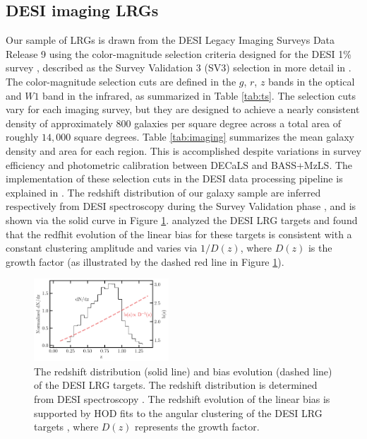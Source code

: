 \subsection{DESI imaging LRGs}
Our sample of LRGs is drawn from the DESI Legacy Imaging Surveys Data Release 9 \citep[DR9;][]{dey2018overview} using the color-magnitude selection criteria designed for the DESI 1\% survey \citep{desi2023sv}, described as the Survey Validation 3 (SV3) selection in more detail in \cite{zhou2022target}. The color-magnitude selection cuts are defined in the $g$, $r$, $z$ bands in the optical and $W1$ band in the infrared, as summarized in Table \ref{tab:ts}. The selection cuts vary for each imaging survey, but they are designed to achieve a nearly consistent density of approximately $800$ galaxies per square degree across a total area of roughly $14,000$ square degrees. Table \ref{tab:imaging} summarizes the mean galaxy density and area for each region. This is accomplished despite variations in survey efficiency and photometric calibration between DECaLS and BASS+MzLS. The implementation of these selection cuts in the DESI data processing pipeline is explained in \cite{myers2022}. The redshift distribution of our galaxy sample are inferred respectively from DESI spectroscopy during the Survey Validation phase \citep{desi2023sv}, and is shown via the solid curve in Figure \ref{fig:nz}. \cite{zhou2021clustering} analyzed the DESI LRG targets and found that the redfhit evolution of the linear bias for these targets is consistent with a constant clustering amplitude and varies via $1/D(z)$, where $D(z)$ is the growth factor (as illustrated by the dashed red line in Figure \ref{fig:nz}). 

\begin{figure}
 \centering
 \includegraphics[width=0.45\textwidth]{figures/nz_lrg.pdf}
 \caption{The redshift distribution (solid line) and bias evolution (dashed line) of the DESI LRG targets. The redshift distribution is determined from DESI spectroscopy \citep{desi2023sv}. The redshift evolution of the linear bias is supported by HOD fits to the angular clustering of the DESI LRG targets \citep{zhou2021clustering}, where $D(z)$ represents the growth factor.}
 \label{fig:nz}
\end{figure}

